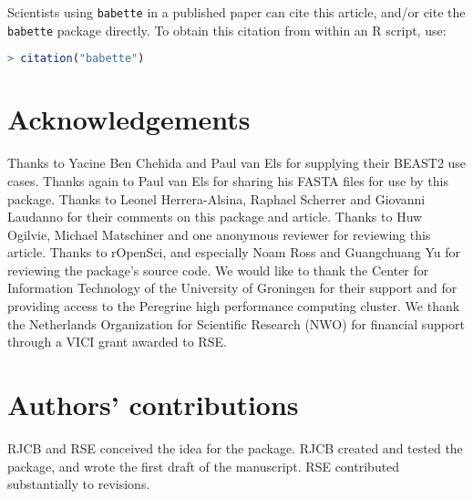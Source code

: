 \documentclass{article}
\begin{document}
Scientists using \verb;babette; in a published paper can cite this
article, and/or cite the \verb;babette; package 
directly. To obtain this citation from within an R script, use:

\begin{lstlisting}[language=R]
> citation("babette")
\end{lstlisting}

\section{Acknowledgements}

Thanks to Yacine Ben Chehida and Paul van Els for supplying their 
BEAST2 use cases. Thanks again to Paul van Els for sharing his FASTA files 
for use by this package. Thanks to Leonel Herrera-Alsina, Raphael Scherrer 
and Giovanni Laudanno for their comments on this package and article.
Thanks to Huw Ogilvie, Michael Matschiner and one anonymous reviewer for reviewing this article.
Thanks to rOpenSci, and especially Noam Ross and Guangchuang Yu for reviewing the package's source code.
We would like to thank the Center for Information Technology of the University 
of Groningen for their support and for providing access to the Peregrine 
high performance computing cluster. We thank the Netherlands 
Organization for Scientific Research (NWO) for financial support 
through a VICI grant awarded to RSE.

\section{Authors' contributions}

RJCB and RSE conceived the idea for the package. RJCB created and tested the package, and wrote the first draft of the manuscript. RSE contributed substantially to revisions.



\end{document}
